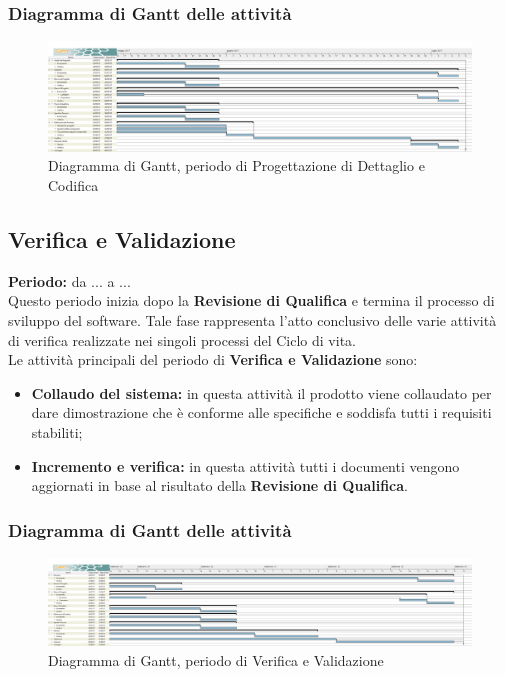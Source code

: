 	\subsubsection{Diagramma di Gantt delle attività}
	\begin{figure}[H]
		\centering
		\includegraphics[width=1\linewidth]{immagini/gantt/progettazione_dettaglio_codifica.png}
		\caption{Diagramma di Gantt, periodo di Progettazione di Dettaglio e Codifica}
	\end{figure}
	\subsection{Verifica e Validazione}
	\textbf{Periodo:} da ... a ... \\
	Questo periodo inizia dopo la \textbf{Revisione di Qualifica} e termina il processo di sviluppo del software. Tale fase rappresenta l'atto conclusivo delle varie attività di verifica realizzate nei singoli processi del Ciclo di vita. \\
	Le attività principali del periodo di \textbf{Verifica e Validazione} sono: \\
	\begin{itemize}
		\item \textbf{Collaudo del sistema:} in questa attività il prodotto viene collaudato per dare
dimostrazione che è conforme alle specifiche e soddisfa tutti i requisiti stabiliti; \\
		\item \textbf{Incremento e verifica:} in questa attività tutti i documenti vengono aggiornati in base al risultato della \textbf{Revisione di Qualifica}. \\
	\end{itemize}
	\subsubsection{Diagramma di Gantt delle attività}
	\begin{figure}[H]
		\centering
		\includegraphics[width=1\linewidth]{immagini/gantt/validazione.png}
		\caption{Diagramma di Gantt, periodo di Verifica e Validazione}
	\end{figure}